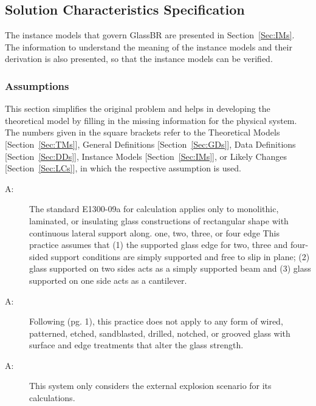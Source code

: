 \documentclass[12pt]{article}
\newcounter{assumpnum}
\newcommand{\atheassumpnum}{A\theassumpnum}
\begin{document}
\subsection{Solution Characteristics Specification}
\label{Sec:SolCharSpec}
The instance models that govern GlassBR are presented in Section~\ref{Sec:IMs}. The information to understand the meaning of the instance models and their derivation is also presented, so that the instance models can be verified.
\subsubsection{Assumptions}
\label{Sec:Assumps}
This section simplifies the original problem and helps in developing the theoretical model by filling in the missing information for the physical system. The numbers given in the square brackets refer to the Theoretical Models {[}Section~\ref{Sec:TMs}{]}, General Definitions {[}Section~\ref{Sec:GDs}{]}, Data Definitions {[}Section~\ref{Sec:DDs}{]}, Instance Models {[}Section~\ref{Sec:IMs}{]}, or Likely Changes {[}Section~\ref{Sec:LCs}{]}, in which the respective assumption is used.
\begin{description}
\item[\atheassumpnum\label{A:glassTyA}:]The standard E1300-09a for calculation applies only to monolithic, laminated, or insulating glass constructions of rectangular shape with continuous lateral support along. one, two, three, or four edge This practice assumes that (1) the supported glass edge for two, three and four-sided support conditions are simply supported and free to slip in plane; (2) glass supported on two sides acts as a simply supported beam and (3) glass supported on one side acts as a cantilever.
\end{description}
\begin{description}
\item[\atheassumpnum\label{A:glassConditionA}:]Following \cite{astm.LR2009} (pg. 1), this practice does not apply to any form of wired, patterned, etched, sandblasted, drilled, notched, or grooved glass with surface and edge treatments that alter the glass strength.
\end{description}
\begin{description}
\item[\atheassumpnum\label{A:explsnScenarioA}:]This system only considers the external explosion scenario for its calculations.
\end{description}
\end{document}
